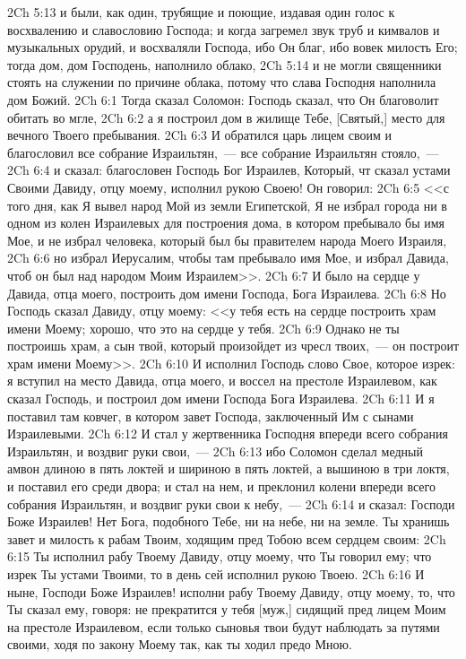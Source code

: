 \vs 2Ch 5:13 и были, как один, трубящие и поющие, издавая один голос к восхвалению и славословию Господа; и когда загремел звук труб и кимвалов и музыкальных орудий, и восхваляли Господа, ибо Он благ, ибо вовек милость Его; тогда дом, дом Господень, наполнило облако,
\vs 2Ch 5:14 и не могли священники стоять на служении по причине облака, потому что слава Господня наполнила дом Божий.
\vs 2Ch 6:1 Тогда сказал Соломон: Господь сказал, что Он благоволит обитать во мгле,
\vs 2Ch 6:2 а я построил дом в жилище Тебе, [Святый,] место для вечного Твоего пребывания.
\vs 2Ch 6:3 И обратился царь лицем своим и благословил все собрание Израильтян,~--- все собрание Израильтян стояло,~---
\vs 2Ch 6:4 и сказал: благословен Господь Бог Израилев, Который, чт сказал устами Своими Давиду, отцу моему, исполнил  рукою Своею! Он говорил:
\vs 2Ch 6:5 <<с того дня, как Я вывел народ Мой из земли Египетской, Я не избрал города ни в одном из колен Израилевых для построения дома, в котором пребывало бы имя Мое, и не избрал человека, который был бы правителем народа Моего Израиля,
\vs 2Ch 6:6 но избрал Иерусалим, чтобы там пребывало имя Мое, и избрал Давида, чтоб он был над народом Моим Израилем>>.
\vs 2Ch 6:7 И было на сердце у Давида, отца моего, построить дом имени Господа, Бога Израилева.
\vs 2Ch 6:8 Но Господь сказал Давиду, отцу моему: <<у тебя есть на сердце построить храм имени Моему; хорошо, что это на сердце у тебя.
\vs 2Ch 6:9 Однако не ты построишь храм, а сын твой, который произойдет из чресл твоих,~--- он построит храм имени Моему>>.
\vs 2Ch 6:10 И исполнил Господь слово Свое, которое изрек: я вступил на место Давида, отца моего, и воссел на престоле Израилевом, как сказал Господь, и построил дом имени Господа Бога Израилева.
\vs 2Ch 6:11 И я поставил там ковчег, в котором завет Господа, заключенный Им с сынами Израилевыми.
\rsbpar\vs 2Ch 6:12 И стал  у жертвенника Господня впереди всего собрания Израильтян, и воздвиг руки свои,~---
\vs 2Ch 6:13 ибо Соломон сделал медный амвон длиною в пять локтей и шириною в пять локтей, а вышиною в три локтя, и поставил его среди двора; и стал на нем, и преклонил колени впереди всего собрания Израильтян, и воздвиг руки свои к небу,~---
\vs 2Ch 6:14 и сказал: Господи Боже Израилев! Нет Бога, подобного Тебе, ни на небе, ни на земле. Ты хранишь завет и милость к рабам Твоим, ходящим пред Тобою всем сердцем своим:
\vs 2Ch 6:15 Ты исполнил рабу Твоему Давиду, отцу моему, что Ты говорил ему; что изрек Ты устами Твоими, то в день сей исполнил рукою Твоею.
\vs 2Ch 6:16 И ныне, Господи Боже Израилев! исполни рабу Твоему Давиду, отцу моему, то, что Ты сказал ему, говоря: не прекратится у тебя [муж,] сидящий пред лицем Моим на престоле Израилевом, если только сыновья твои будут наблюдать за путями своими, ходя по закону Моему так, как ты ходил предо Мною.
